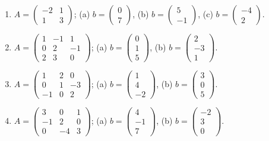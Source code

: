 \begin{enumerate}[label=\arabic*., leftmargin=*]
\item $A=\begin{pmatrix}-2&1\\1&3\end{pmatrix}$; \quad
(a) $b=\begin{pmatrix}0\\7\end{pmatrix}$, \quad
(b) $b=\begin{pmatrix}5\\-1\end{pmatrix}$, \quad
(c) $b=\begin{pmatrix}-4\\2\end{pmatrix}$.

\item $A=\begin{pmatrix}1&-1&1\\0&2&-1\\2&3&0\end{pmatrix}$; \quad
(a) $b=\begin{pmatrix}0\\1\\5\end{pmatrix}$, \quad
(b) $b=\begin{pmatrix}2\\-3\\1\end{pmatrix}$.

\item $A=\begin{pmatrix}1&2&0\\0&1&-3\\-1&0&2\end{pmatrix}$; \quad
(a) $b=\begin{pmatrix}1\\4\\-2\end{pmatrix}$, \quad
(b) $b=\begin{pmatrix}3\\0\\5\end{pmatrix}$.

\item $A=\begin{pmatrix}3&0&1\\-1&2&0\\0&-4&3\end{pmatrix}$; \quad
(a) $b=\begin{pmatrix}4\\-1\\7\end{pmatrix}$, \quad
(b) $b=\begin{pmatrix}-2\\3\\0\end{pmatrix}$.


\end{enumerate}
